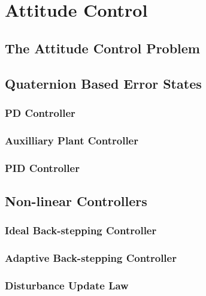 \section{Attitude Control}
\label{sec:control.attitude}
\subsection{The Attitude Control Problem}
\label{subsec:control.attitude.problem}
\subsection{Quaternion Based Error States}
\label{subsec:control.attitude.quaternion}
\subsubsection{PD Controller}
\subsubsection{Auxilliary Plant Controller}
\subsubsection{PID Controller}
\subsection{Non-linear Controllers}
\label{subsec:control.attitude.nonlinear}
\subsubsection{Ideal Back-stepping Controller}
\subsubsection{Adaptive Back-stepping Controller}
\subsubsection*{Disturbance Update Law}
